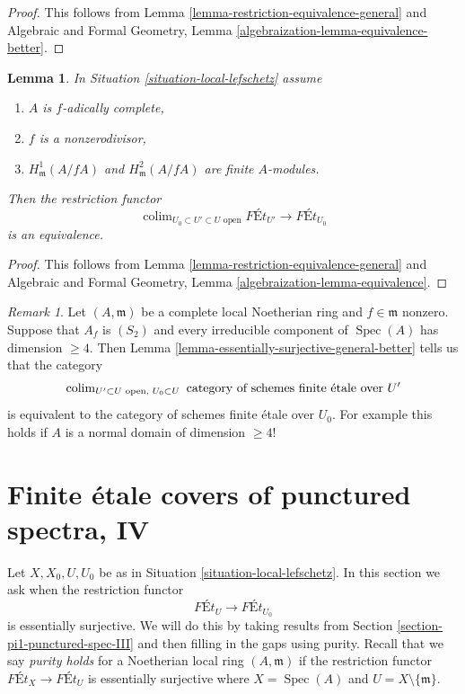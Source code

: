 \documentclass{stacks-project}
\theoremstyle{plain}
\newtheorem{lemma}[subsection]{Lemma}
\theoremstyle{definition}
\theoremstyle{remark}
\newtheorem{remark}[subsection]{Remark}
\numberwithin{equation}{subsection}
\def\colim{\mathop{\mathrm{colim}}\nolimits}
\def\Spec{\mathop{\mathrm{Spec}}}
\begin{document}
\begin{proof}
This follows from Lemma \ref{lemma-restriction-equivalence-general}
and
Algebraic and Formal Geometry, Lemma
\ref{algebraization-lemma-equivalence-better}.
\end{proof}

\begin{lemma}
\label{lemma-essentially-surjective-general}
In Situation \ref{situation-local-lefschetz} assume
\begin{enumerate}
\item $A$ is $f$-adically complete,
\item $f$ is a nonzerodivisor,
\item $H^1_\mathfrak m(A/fA)$ and $H^2_\mathfrak m(A/fA)$
are finite $A$-modules.
\end{enumerate}
Then the restriction functor
$$
\colim_{U_0 \subset U' \subset U\text{ open}} \textit{F\'Et}_{U'}
\longrightarrow
\textit{F\'Et}_{U_0}
$$
is an equivalence.
\end{lemma}

\begin{proof}
This follows from Lemma \ref{lemma-restriction-equivalence-general}
and
Algebraic and Formal Geometry, Lemma
\ref{algebraization-lemma-equivalence}.
\end{proof}

\begin{remark}
\label{remark-combine}
Let $(A, \mathfrak m)$ be a complete local Noetherian ring and
$f \in \mathfrak m$ nonzero. Suppose that $A_f$ is $(S_2)$ and
every irreducible component of $\Spec(A)$ has dimension $\geq 4$.
Then Lemma \ref{lemma-essentially-surjective-general-better}
tells us that the category
$$
\colim\nolimits_{U' \subset U\text{ open, }U_0 \subset U}
\text{ category of schemes finite \'etale over }U'
$$
is equivalent to the category of schemes finite \'etale over $U_0$.
For example this holds if $A$ is a normal domain of dimension $\geq 4$!
\end{remark}




\section{Finite \'etale covers of punctured spectra, IV}
\label{section-pi1-punctured-spec-IV}

\noindent
Let $X, X_0, U, U_0$ be as in Situation \ref{situation-local-lefschetz}.
In this section we ask when the restriction functor
$$
\textit{F\'Et}_U
\longrightarrow
\textit{F\'Et}_{U_0}
$$
is essentially surjective.
We will do this by taking results from
Section \ref{section-pi1-punctured-spec-III}
and then filling in the gaps using purity. Recall that
we say {\it purity holds} for a Noetherian local ring
$(A, \mathfrak m)$ if the restriction functor
$\textit{F\'Et}_X \to \textit{F\'Et}_U$ is essentially
surjective where $X = \Spec(A)$ and $U = X \setminus \{\mathfrak m\}$.
\end{document}

